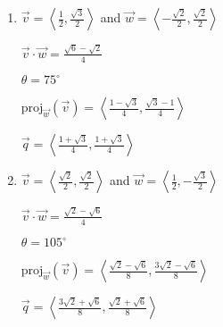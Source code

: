 \documentclass{ximera}
\begin{document}
\begin{multicols}{2} \raggedcolumns 
\begin{enumerate}
\setcounter{enumi}{\value{HW}}

\item $\vec{v} = \left\langle \frac{1}{2}, \frac{\sqrt{3}}{2} \right\rangle$ and $\vec{w} = \left\langle -\frac{\sqrt{2}}{2}, \frac{\sqrt{2}}{2} \right\rangle$

 $\vec{v} \cdot \vec{w} = \frac{\sqrt{6} - \sqrt{2}}{4}$

 $\theta = 75^{\circ}$ 

 $\text{proj}_{\vec{w}}(\vec{v}) = \left\langle \frac{1-\sqrt{3}}{4}, \frac{\sqrt{3} - 1}{4} \right\rangle$

 $\vec{q} = \left\langle \frac{1+\sqrt{3}}{4}, \frac{1 +\sqrt{3}}{4} \right\rangle$
 \vfill
 
\item $\vec{v} = \left\langle \frac{\sqrt{2}}{2}, \frac{\sqrt{2}}{2} \right\rangle$ and $\vec{w} = \left\langle \frac{1}{2}, -\frac{\sqrt{3}}{2} \right\rangle$

 $\vec{v} \cdot \vec{w} = \frac{\sqrt{2} - \sqrt{6}}{4}$

 $\theta  = 105^{\circ}$ 

 $\text{proj}_{\vec{w}}(\vec{v}) = \left\langle \frac{\sqrt{2}-\sqrt{6}}{8}, \frac{3\sqrt{2} - \sqrt{6}}{8} \right\rangle$

 $\vec{q} =  \left\langle \frac{3\sqrt{2}+\sqrt{6}}{8}, \frac{\sqrt{2} + \sqrt{6}}{8} \right\rangle$

\setcounter{HW}{\value{enumi}}
\end{enumerate}
\end{multicols}
\end{document}
